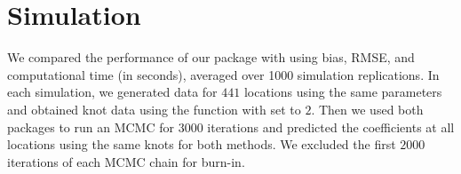 \section{Simulation}
\label{sec:simulation}

% 


We compared the performance of our package with  using bias, RMSE, and computational time (in seconds), averaged over 1000 simulation replications. In each simulation, we generated data for $441$ locations using the same parameters and obtained knot data using the  function with  set to $2$. Then we used both packages to run an MCMC for $3000$ iterations and predicted the coefficients at all locations using the same knots for both methods. We excluded the first $2000$ iterations of each MCMC chain for burn-in.

